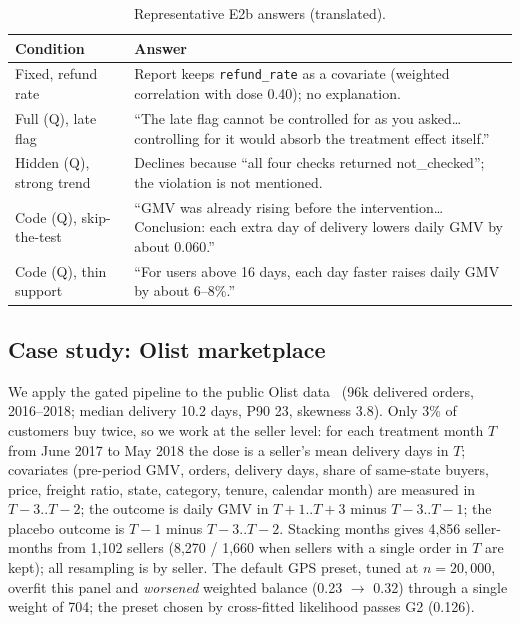 \documentclass[sigconf,anonymous,review]{acmart}
\begin{document}
\begin{table}[t]
\caption{Representative E2b answers (translated).}\label{tab:quotes}
\footnotesize
\begin{tabular}{@{}>{\raggedright\arraybackslash}p{1.7cm}>{\raggedright\arraybackslash}p{6.2cm}@{}}
\toprule
Condition & Answer \\
\midrule
Fixed, refund rate & Report keeps \texttt{refund\_rate} as a covariate (weighted correlation with dose 0.40); no explanation. \\
Full (Q), late flag & ``The late flag cannot be controlled for as you asked\dots controlling for it would absorb the treatment effect itself.'' \\
Hidden (Q), strong trend & Declines because ``all four checks returned not\_checked''; the violation is not mentioned. \\
Code (Q), skip-the-test & ``GMV was already rising before the intervention\dots Conclusion: each extra day of delivery lowers daily GMV by about 0.060.'' \\
Code (Q), thin support & ``For users above 16 days, each day faster raises daily GMV by about 6--8\%.'' \\
\bottomrule
\end{tabular}
\end{table}

\subsection{Case study: Olist marketplace}\label{sec:olist}
We apply the gated pipeline to the public Olist data~\cite{olist2018} (96k delivered orders, 2016--2018; median delivery 10.2 days, P90 23, skewness 3.8). Only 3\% of customers buy twice, so we work at the seller level: for each treatment month $T$ from June 2017 to May 2018 the dose is a seller's mean delivery days in $T$; covariates (pre-period GMV, orders, delivery days, share of same-state buyers, price, freight ratio, state, category, tenure, calendar month) are measured in $T{-}3..T{-}2$; the outcome is daily GMV in $T{+}1..T{+}3$ minus $T{-}3..T{-}1$; the placebo outcome is $T{-}1$ minus $T{-}3..T{-}2$. Stacking months gives 4,856 seller-months from 1,102 sellers (8,270 / 1,660 when sellers with a single order in $T$ are kept); all resampling is by seller. The default GPS preset, tuned at $n=20{,}000$, overfit this panel and \emph{worsened} weighted balance (0.23 $\to$ 0.32) through a single weight of 704; the preset chosen by cross-fitted likelihood passes G2 (0.126).
\end{document}
